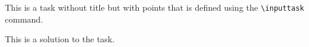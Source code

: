 This is a task without title but with points that is defined using the \texttt{\textbackslash inputtask} command.

\begin{solution}
    This is a solution to the task.
\end{solution}
